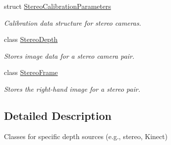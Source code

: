 \begin{DoxyCompactItemize}
struct \hyperlink{structfovis_1_1StereoCalibrationParameters}{StereoCalibrationParameters}
\begin{DoxyCompactList}\small\item\em Calibration data structure for stereo cameras. \end{DoxyCompactList}\item 
class \hyperlink{classfovis_1_1StereoDepth}{StereoDepth}
\begin{DoxyCompactList}\small\item\em Stores image data for a stereo camera pair. \end{DoxyCompactList}\item 
class \hyperlink{classfovis_1_1StereoFrame}{StereoFrame}
\begin{DoxyCompactList}\small\item\em Stores the right-\/hand image for a stereo pair. \end{DoxyCompactList}\end{DoxyCompactItemize}


\subsection{Detailed Description}
Classes for specific depth sources (e.g., stereo, Kinect) 